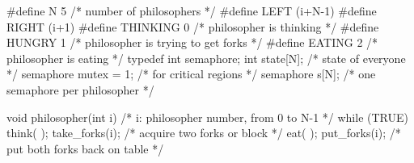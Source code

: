 \documentclass[varwidth=34em,crop]{standalone}
\begin{document}
\begin{ccode}
#define N 5              /* number of philosophers */
#define LEFT (i+N-1)%
#define RIGHT (i+1)%
#define THINKING 0       /* philosopher is thinking */
#define HUNGRY 1         /* philosopher is trying to get forks */
#define EATING 2         /* philosopher is eating */
typedef int semaphore;
int state[N];            /* state of everyone */
semaphore mutex = 1;     /* for critical regions */
semaphore s[N];          /* one semaphore per philosopher */

void philosopher(int i)  /* i: philosopher number, from 0 to N-1 */
{
     while (TRUE) {   
          think( );   
          take_forks(i); /* acquire two forks or block */
          eat( );     
          put_forks(i);  /* put both forks back on table */
     }
}
\end{ccode}
\end{document}
